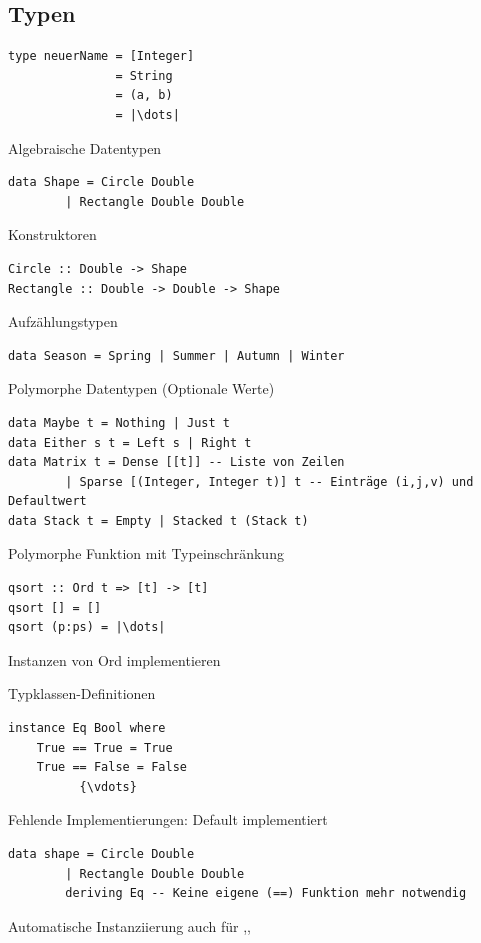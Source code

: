 \documentclass{Zusammenfassung}
\begin{document}
\subsection{Typen}\label{subsec:typen}
\begin{verbatim}
type neuerName = [Integer]
               = String
               = (a, b)
               = |\dots|
\end{verbatim}
\begin{multicols}{2}
Algebraische Datentypen
\begin{verbatim}
data Shape = Circle Double
        | Rectangle Double Double
\end{verbatim}
\columnbreak
Konstruktoren
\begin{verbatim}
Circle :: Double -> Shape
Rectangle :: Double -> Double -> Shape
\end{verbatim}
\end{multicols}
Aufzählungstypen
\begin{verbatim}
data Season = Spring | Summer | Autumn | Winter
\end{verbatim}
Polymorphe Datentypen (Optionale Werte)
\begin{verbatim}
data Maybe t = Nothing | Just t
data Either s t = Left s | Right t
data Matrix t = Dense [[t]] -- Liste von Zeilen
        | Sparse [(Integer, Integer t)] t -- Einträge (i,j,v) und Defaultwert
data Stack t = Empty | Stacked t (Stack t)
\end{verbatim}
Polymorphe Funktion mit Typeinschränkung
\begin{multicols}{2}
\begin{verbatim}
qsort :: Ord t => [t] -> [t]
qsort [] = []
qsort (p:ps) = |\dots|
\end{verbatim}
\columnbreak
Instanzen von Ord implementieren 
\end{multicols}
\begin{multicols}{2}
Typklassen-Definitionen
\begin{verbatim}
instance Eq Bool where
    True == True = True
    True == False = False
          {\vdots}
    \end{verbatim}
    \columnbreak
    Fehlende Implementierungen: Default implementiert
\end{multicols}
\begin{verbatim}
data shape = Circle Double
        | Rectangle Double Double
        deriving Eq -- Keine eigene (==) Funktion mehr notwendig
\end{verbatim}
Automatische Instanziierung auch für ,,
\end{document}
